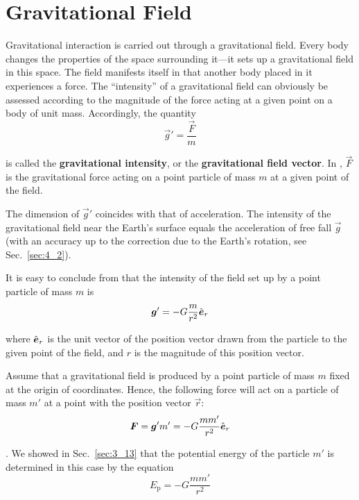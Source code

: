 \section{Gravitational Field}\label{sec:6_2}

Gravitational interaction is carried out through a gravitational field. Every body changes the properties of the space surrounding it---it sets up a gravitational field in this space. The field manifests itself in that another body placed in it experiences a force. The ``intensity'' of a gravitational field can obviously be assessed according to the magnitude of the force acting at a given point on a body of unit mass. Accordingly, the quantity
\begin{equation}\label{eq:6_6}
	\vec{g}' = \frac{\vec{F}}{m}
\end{equation}

\noindent
is called the \textbf{gravitational intensity}, or the \textbf{gravitational field vector}. In , $\vec{F}$ is the gravitational force acting on a point particle of mass $m$ at a given point of the field.

The dimension of $\vec{g}'$ coincides with that of acceleration. The intensity of the gravitational field near the Earth's surface equals the acceleration of free fall $\vec{g}$ (with an accuracy up to the correction due to the Earth's rotation, see Sec.~\ref{sec:4_2}).

It is easy to conclude from  that the intensity of the field set up by a point particle of mass $m$ is
\begin{equation}\label{eq:6_7}
	\boldsymbol{g}' = -G\frac{m}{r^2}\hat{\boldsymbol{e}}_{r}
\end{equation}

\noindent
where $\hat{\boldsymbol{e}}_{r}$ is the unit vector of the position vector drawn from the particle to the given point of the field, and $r$ is the magnitude of this position vector.

Assume that a gravitational field is produced by a point particle of mass $m$ fixed at the origin of coordinates. Hence, the following force will act on a particle of mass $m'$ at a point with the position vector $\vec{r}$:
\begin{equation}\label{eq:6_8}
	\boldsymbol{F} = \boldsymbol{g}'m' = -G\frac{mm'}{r^2}\hat{\boldsymbol{e}}_{r}
\end{equation}

. We showed in Sec.~\ref{sec:3_13} that the potential energy of the particle $m'$ is determined in this case by the equation
\begin{equation}\label{eq:6_9}
	E_{\text{p}} = -G\frac{mm'}{r^2}
\end{equation}

